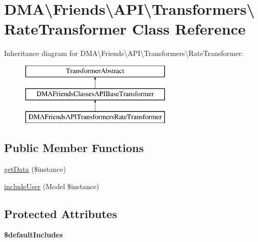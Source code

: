 \hypertarget{classDMA_1_1Friends_1_1API_1_1Transformers_1_1RateTransformer}{}\section{D\+M\+A\textbackslash{}Friends\textbackslash{}A\+P\+I\textbackslash{}Transformers\textbackslash{}Rate\+Transformer Class Reference}
\label{classDMA_1_1Friends_1_1API_1_1Transformers_1_1RateTransformer}
Inheritance diagram for D\+M\+A\textbackslash{}Friends\textbackslash{}A\+P\+I\textbackslash{}Transformers\textbackslash{}Rate\+Transformer\+:\begin{figure}[H]
\begin{center}
\leavevmode
\includegraphics[height=3.000000cm]{d3/df5/classDMA_1_1Friends_1_1API_1_1Transformers_1_1RateTransformer}
\end{center}
\end{figure}
\subsection*{Public Member Functions}
\begin{DoxyCompactItemize}
\item 
\hyperlink{classDMA_1_1Friends_1_1API_1_1Transformers_1_1RateTransformer_a27ed532bf412c45c32615058c9ff80bb}{get\+Data} (\$instance)
\item 
\hyperlink{classDMA_1_1Friends_1_1API_1_1Transformers_1_1RateTransformer_ae7ba3b8c09f2218ac4b771f8940a5921}{include\+User} (Model \$instance)
\end{DoxyCompactItemize}
\subsection*{Protected Attributes}
\begin{DoxyCompactItemize}
\item 
{\bfseries \$default\+Includes}
\end{DoxyCompactItemize}


